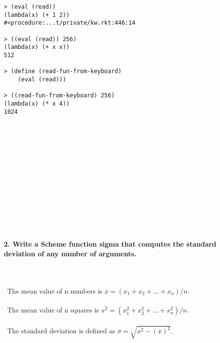 \documentclass{article}
\begin{document}
\begin{verbatim} 
> (eval (read))
(lambda(x) (+ 1 2))
#<procedure:...t/private/kw.rkt:446:14

> ((eval (read)) 256)
(lambda(x) (+ x x))
512

> (define (read-fun-from-keyboard)
    (eval (read)))

> ((read-fun-from-keyboard) 256)
(lambda(x) (* x 4))
1024
\end{verbatim}


\paragraph{}\
\paragraph{}\
\paragraph{}\
\paragraph{}\
\paragraph{}\
\paragraph{}\

	
	
	\rmfamily
	
	\paragraph{2. Write a Scheme function sigma that computes the standard deviation of any number of arguments.}\
	
\paragraph{}\
		The mean value of n numbers is \(\overline{x} = (x_1 + x_2 + \ldots + x_n) / n\).
\paragraph{}\
		The mean value of n squares is \(\overline{x^2} = (x_1^2 + x_2^2 + \ldots + x_n^2) / n\).
\paragraph{}\
		The standard deviation is defined as \(\sigma = \sqrt{ \overline{x^2} - (\overline{x})^2 } \).
\end{document}
